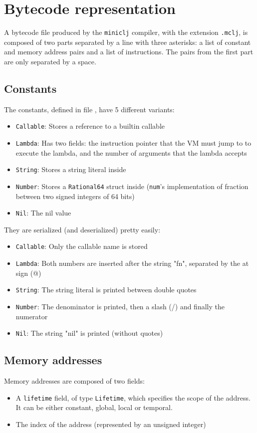 \documentclass[11pt]{scrreprt}
\begin{document}
\section{Bytecode representation}
\label{comp:bytecode}
A bytecode file produced by the \texttt{miniclj} compiler, with the extension \texttt{.mclj}, is composed of two parts separated by a line with three asterisks: a list of constant and memory address pairs and a list of instructions. The pairs from the first part are only separated by a space.

\subsection{Constants}
The constants, defined in file , have 5 different variants:
\begin{itemize}
  \item \texttt{Callable}: Stores a reference to a builtin callable
  \item \texttt{Lambda}: Has two fields: the instruction pointer that the VM must jump to to execute the lambda, and the number of arguments that the lambda accepts
  \item \texttt{String}: Stores a string literal inside
  \item \texttt{Number}: Stores a \texttt{Rational64} struct inside (\texttt{num}'s implementation of fraction between two signed integers of 64 bits)
  \item \texttt{Nil}: The nil value
\end{itemize}

They are serialized (and deserialized) pretty easily:
\begin{itemize}
  \item \texttt{Callable}: Only the callable name is stored
  \item \texttt{Lambda}: Both numbers are inserted after the string "fn", separated by the at sign (@)
  \item \texttt{String}: The string literal is printed between double quotes
  \item \texttt{Number}: The denominator is printed, then a slash (/) and finally the numerator
  \item \texttt{Nil}: The string "nil" is printed (without quotes)
\end{itemize}

\subsection{Memory addresses}
Memory addresses are composed of two fields:
\begin{itemize}
  \item A \texttt{lifetime} field, of type \texttt{Lifetime}, which specifies the scope of the address. It can be either constant, global, local or temporal.
  \item The index of the address (represented by an unsigned integer)
\end{itemize}
\end{document}

